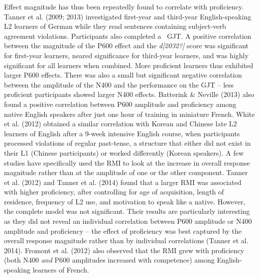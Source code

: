 \documentclass[11pt]{article}
\newenvironment{styleStandard}{\renewcommand\baselinestretch{1.0}\setlength\leftskip{0cm}\setlength\rightskip{0cm plus 1fil}\setlength\parindent{0cm}\setlength\parfillskip{0pt plus 1fil}\setlength\parskip{0in plus 1pt}\writerlistparindent\writerlistleftskip\leavevmode\normalfont\normalsize\writerlistlabel\ignorespaces}{\unskip\vspace{0.111in plus 0.0111in}\par}
\newcommand\writerlistleftskip{}
\newcommand\writerlistparindent{}
\newcommand\writerlistlabel{}
\begin{document}
\begin{styleStandard}
Effect magnitude has thus been repeatedly found to correlate with proficiency. Tanner et al. (2009; 2013) investigated first-year and third-year English-speaking L2 learners of German while they read sentences containing subject-verb agreement violations. Participants also completed a \ GJT. A positive correlation between the magnitude of the P600 effect and the \textit{d[2032?]} score was significant for first-year learners, neared significance for third-year learners, and was highly significant for all learners when combined. More proficient learners thus exhibited larger P600 effects. There was also a small but significant negative correlation between the amplitude of the N400 and the performance on the GJT – less proficient participants showed larger N400 effects. Batterink \& Neville (2013) also found a positive correlation between P600 amplitude and proficiency among native English speakers after just one hour of training in miniature French. White et al. (2012) obtained a similar correlation with Korean and Chinese late L2 learners of English after a 9-week intensive English course, when participants processed violations of regular past-tense, a structure that either did not exist in their L1 (Chinese participants) or worked differently (Korean speakers). A few studies have specifically used the RMI to look at the increase in overall response magnitude rather than at the amplitude of one or the other component. Tanner et al. (2012) and Tanner et al. (2014) found that a larger RMI was associated with higher proficiency, after controlling for age of acquisition, length of residence, frequency of L2 use, and motivation to speak like a native. However, the complete model was not significant. Their results are particularly interesting as they did not reveal an individual correlation between P600 amplitude or N400 amplitude and proficiency – the effect of proficiency was best captured by the overall response magnitude rather than by individual correlations (Tanner et al. 2014). Fromont et al. (2012) also observed that the RMI grew with proficiency (both N400 \textit{and} P600 amplitudes increased with competence) among English-speaking learners of French.
\end{styleStandard}
\end{document}
